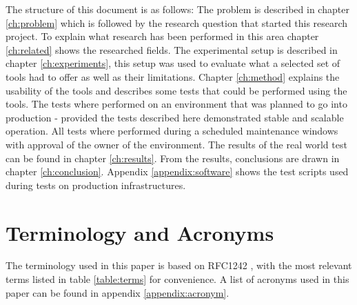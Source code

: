 The structure of this document is as follows: The problem is described in chapter \ref{ch:problem} which is followed by the research question that started this research project. To explain what research has been performed in this area chapter \ref{ch:related} shows the researched fields. The experimental setup is described in chapter \ref{ch:experiments}, this setup was used to evaluate what a selected set of tools had to offer as well as their limitations.
Chapter \ref{ch:method} explains the usability of the tools and describes some tests that could be performed using the tools. The tests where performed on an environment that was planned to go into production - provided the tests described here demonstrated stable and scalable operation. All tests where performed during a scheduled maintenance windows with approval of the owner of the environment. The results of the real world test can be found in chapter \ref{ch:results}. 
From the results, conclusions are drawn in chapter \ref{ch:conclusion}. Appendix \ref{appendix:software} shows the test scripts used during tests on production infrastructures.

\section{Terminology and Acronyms}\label{sec:terminology}
The terminology used in this paper is based on RFC1242 \cite{rfc1242}, with the most relevant terms listed in table \ref{table:terms} for convenience.
A list of acronyms used in this paper can be found in appendix \ref{appendix:acronym}.

